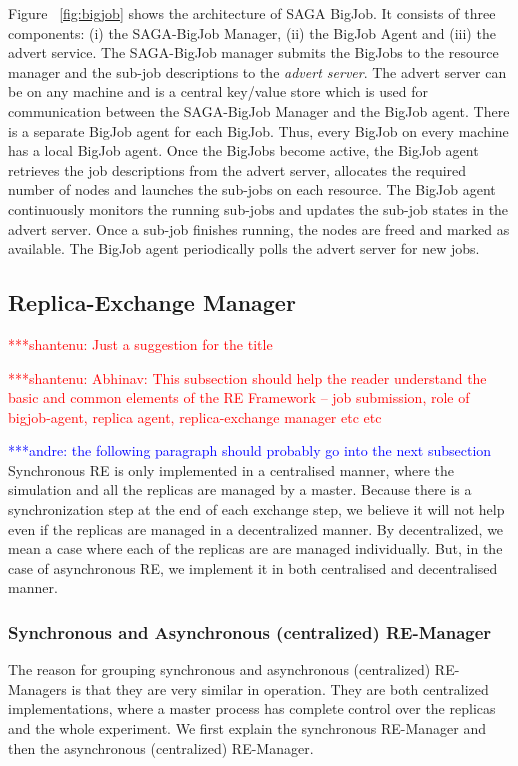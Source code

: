 \documentclass{rspublic}
\newcommand{\jhanote}[1]{ {\textcolor{red} { ***shantenu: #1 }}}
\newcommand{\alnote}[1]{ {\textcolor{blue} { ***andre: #1 }}}
\newcommand{\alnote}[1]{}
\newcommand{\jhanote}[1]{}
\begin{document}
Figure ~\ref{fig:bigjob} shows the architecture of SAGA BigJob.
It consists of three components: (i) the SAGA-BigJob Manager, (ii) the BigJob Agent and (iii) the advert service. The SAGA-BigJob manager submits the BigJobs to the resource manager and the sub-job descriptions to the \emph{advert server}. The advert server can be on any machine and is a central key/value store which is used for communication between the SAGA-BigJob Manager and the BigJob agent. There is a separate BigJob agent for each BigJob. Thus, every BigJob on every machine has a local BigJob agent. Once the BigJobs become active, the BigJob agent retrieves the job descriptions from the advert server, allocates the required number of nodes and launches the sub-jobs on each resource. The BigJob agent continuously monitors the running sub-jobs and updates the sub-job states in the advert server. Once a sub-job finishes running, the nodes are freed and marked as available. The BigJob agent periodically polls the advert server for new jobs.
\subsection{Replica-Exchange Manager}\label{repexmanager} 

\jhanote{Just a suggestion for the title}

\jhanote{Abhinav: This subsection should help the reader understand
  the basic and common elements of the RE Framework -- job submission,
  role of bigjob-agent, replica agent, replica-exchange manager etc
  etc}
  
\alnote{the following paragraph should probably go into the next subsection}
Synchronous RE is only implemented in a centralised manner, where the
simulation and all the replicas are managed by a master. 
Because there is a synchronization step at the end of each exchange
step, we believe it will not help even if the replicas are managed in
a decentralized manner. By decentralized, we mean a case where each of the replicas are are managed individually. But, in the case of asynchronous RE, we
implement it in both centralised and decentralised manner. %


\subsubsection{Synchronous and Asynchronous (centralized) RE-Manager}
The reason for grouping synchronous and asynchronous (centralized) RE-Managers is that they are very similar in operation. They are both centralized implementations, where a master process has complete control over the replicas and the whole experiment. We first explain the synchronous RE-Manager and then the asynchronous (centralized) RE-Manager.
\end{document}
